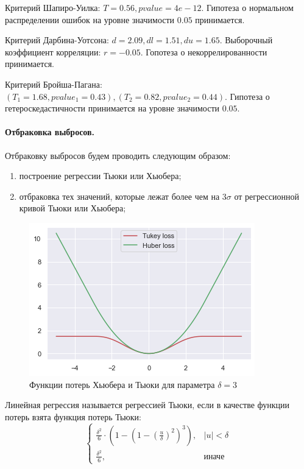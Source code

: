 \documentclass[a4paper,12pt]{article}
\begin{document}
Критерий Шапиро-Уилка: $T = 0.56, pvalue = 4e-12$. Гипотеза о нормальном распределении ошибок на уровне значимости $0.05$ принимается.

Критерий Дарбина-Уотсона: $d = 2.09, dl=1.51, du=1.65$. Выборочный коэффициент корреляции: $r = -0.05$. Гопотеза о некоррелированности принимается.

Критерий Бройша-Пагана: $(T_1 = 1.68, pvalue_1 = 0.43), (T_2 = 0.82, pvalue_2 = 0.44)$. Гипотеза о гетероскедастичности принимается на уровне значимости $0.05$.


\paragraph{Отбраковка выбросов.\\}

Отбраковку выбросов будем проводить следующим образом:
\begin{enumerate}
    \item построение регрессии Тьюки или Хьюбера;
    \item отбраковка тех значений, которые лежат более чем на $3\sigma$ от регрессионной кривой Тьюки или Хьюбера;
\end{enumerate}

\begin{figure}
    \vspace{-2ex}
    \includegraphics[width=\linewidth]{src/img/Тьюки_и_Хьюбер.png}
    \caption{Функции потерь Хьюбера и Тьюки для параметра $\delta=3$}
\end{figure}

Линейная регрессия называется регрессией Тьюки, если в качестве функции потерь взята функция потерь Тьюки:
$$
\begin{cases}
    \frac{\delta^2}{6} \cdot \left(1 - \left(1 - \left(\frac{u}{\delta} \right)^2\right)^3\right), & |u| < \delta\\
    \frac{\delta^2}{6}, & \text{иначе}
\end{cases}
$$
\end{document}
